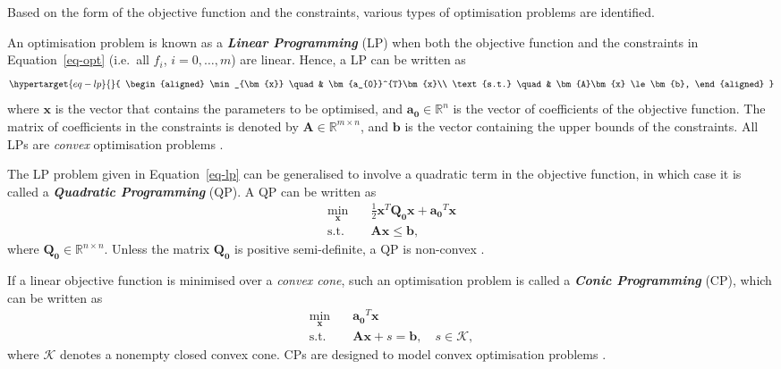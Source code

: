 \documentclass[11pt,a4paper,]{article}
\begin{document}
Based on the form of the objective function and the constraints, various
types of optimisation problems are identified.

An optimisation problem is known as a \textbf{\emph{Linear Programming}}
(LP) when both the objective function and the constraints in
Equation~\ref{eq-opt} (i.e.~all \(f_{i}\), \(i = 0, \dots, m\)) are
linear. Hence, a LP can be written as
\begin{equation}\protect\hypertarget{eq-lp}{}{
\begin{aligned}
  \min_{\bm{x}} \quad & \bm{a_{0}}^{T}\bm{x}\\
  \text{s.t.} \quad & \bm{A}\bm{x} \le \bm{b},
\end{aligned}
}\label{eq-lp}\end{equation} where \(\bm{x}\) is the vector that
contains the parameters to be optimised, and
\(\bm{a_{0}} \in \mathbb{R}^{n}\) is the vector of coefficients of the
objective function. The matrix of coefficients in the constraints is
denoted by \(\bm{A} \in \mathbb{R}^{m \times n}\), and \(\bm{b}\) is the
vector containing the upper bounds of the constraints. All LPs are
\emph{convex} optimisation problems \autocite{Theusl2020}.

The LP problem given in Equation~\ref{eq-lp} can be generalised to
involve a quadratic term in the objective function, in which case it is
called a \textbf{\emph{Quadratic Programming}} (QP). A QP can be written
as \[
\begin{aligned}
  \min_{\bm{x}} \quad & \frac{1}{2} \bm{x}^{T} \bm{Q_{0}} \bm{x} + \bm{a_{0}}^{T}\bm{x}\\
  \text{s.t.} \quad & \bm{A}\bm{x} \le \bm{b},
\end{aligned}
\] where \(\bm{Q_{0}} \in \mathbb{R}^{n \times n}\). Unless the matrix
\(\bm{Q_{0}}\) is positive semi-definite, a QP is non-convex
\autocite{Theusl2020}.

If a linear objective function is minimised over a \emph{convex cone},
such an optimisation problem is called a \textbf{\emph{Conic
Programming}} (CP), which can be written as \[
\begin{aligned}
  \min_{\bm{x}} \quad & \bm{a_{0}}^{T}\bm{x} \\
  \text{s.t.} \quad & \bm{A}\bm{x} + s = \bm{b}, \quad s \in \mathcal{K},
\end{aligned}
\] where \(\mathcal{K}\) denotes a nonempty closed convex cone. CPs are
designed to model convex optimisation problems \autocite{Theusl2020}.
\end{document}
